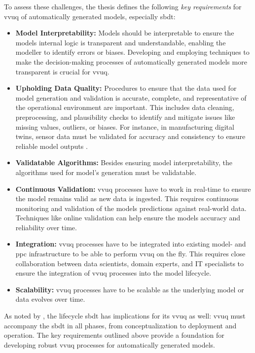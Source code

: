 To assess these challenges, the thesis defines the following \textit{key requirements} for \gls{vvuq} of automatically generated models, especially \gls{sbdt}:
\begin{itemize}
  \label{par:key-requirements}
  \item \textbf{Model Interpretability:} \label{par:surrogate} Models should be interpretable to ensure the models internal logic is transparent and understandable, enabling the modeller to identify errors or biases. Developing and employing techniques to make the decision-making processes of automatically generated models more transparent is crucial for \gls{vvuq}.
  \item \textbf{Upholding Data Quality:} Procedures to ensure that the data used for model generation and validation is accurate, complete, and representative of the operational environment are important. This includes data cleaning, preprocessing, and plausibility checks to identify and mitigate issues like missing values, outliers, or biases. For instance, in manufacturing digital twins, sensor data must be validated for accuracy and consistency to ensure reliable model outputs \autocite{rodriguez2023updating}.
  \item \textbf{Validatable Algorithms:} Besides ensuring model interpretability, the algorithms used for model's generation must be validatable.
  \item \textbf{Continuous Validation:} \gls{vvuq} processes have to work in real-time to ensure the model remains valid as new data is ingested. This requires continuous monitoring and validation of the models predictions against real-world data. Techniques like online validation \autocite{francis2021towards} can help ensure the models accuracy and reliability over time.
  \item \textbf{Integration:} \gls{vvuq} processes have to be integrated into existing model- and \gls{ppc} infrastructure to be able to perform \gls{vvuq} on the fly. This requires close collaboration between data scientists, domain experts, and IT specialists to ensure the integration of \gls{vvuq} processes into the model lifecycle.
  \item \textbf{Scalability:} \gls{vvuq} processes have to be scalable as the underlying model or data evolves over time.
\end{itemize}

As noted by \textcite{francis2021towards}, the lifecycle \gls{sbdt} has implications for its \gls{vvuq} as well: \gls{vvuq} must accompany the \gls{sbdt} in all phases, from conceptualization to deployment and operation. The key requirements outlined above provide a foundation for developing robust \gls{vvuq} processes for automatically generated models.

